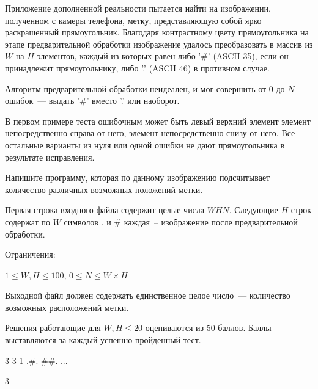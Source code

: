 
Приложение дополненной реальности пытается найти на изображении, полученном с камеры телефона, метку, представляющую собой ярко раскрашенный прямоугольник. Благодаря контрастному цвету прямоугольника на этапе предварительной обработки изображение удалось преобразовать в массив из $W$ на $H$ элементов, каждый из которых равен либо '#' (ASCII 35), если он принадлежит прямоугольнику, либо '.' (ASCII 46) в противном случае.

Алгоритм предварительной обработки неидеален, и мог совершить от $0$ до $N$ ошибок~--- выдать '#' вместо '.' или наоборот.

В первом примере теста ошибочным может быть левый верхний элемент элемент непосредственно справа от него, элемент непосредственно снизу от него. Все остальные варианты из нуля или одной ошибки не дают прямоугольника в результате исправления.

Напишите программу, которая по данному изображению подсчитывает количество различных возможных положений метки.


Первая строка входного файла содержит целые числа $W H N$. Следующие $H$ строк содержат по $W$ символов . и # каждая~--
изображение после предварительной обработки.

Ограничения:

$1 \le W, H \le 100$, $0 \le N \le W \times H$

\outputfmtSection

Выходной файл должен содержать единственное целое число~--- количество возможных расположений метки.

\markSection

Решения работающие для $W, H \le 20$ оцениваются из 50 баллов. Баллы выставляются за каждый успешно пройденный тест.


\begin{myverbbox}[\small]{\vinput}
    3 3 1
    .#.
    ##.
    ...
\end{myverbbox}
\begin{myverbbox}[\small]{\voutput}
    3
\end{myverbbox}

